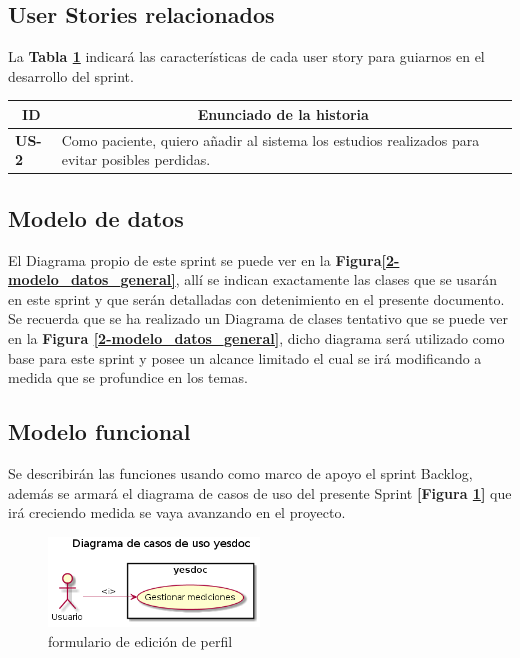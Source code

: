 \documentclass[a4paper,12pt]{article}
\begin{document}
\subsection{User Stories relacionados}
La \textbf{Tabla \ref{US-Sprint8}} indicará las características de cada user story para guiarnos en el desarrollo del sprint.
\begin{table}[h]
    \label{US-Sprint8}
    \centering
	\begin{tabular}{|l|p{9cm}|}
	\hline
        \multicolumn{1}{|c|}{\textbf{ID}} &
        \multicolumn{1}{|c|}{\textbf{Enunciado de la historia}} \\          
    \hline
        \textbf{US-2 } & Como paciente, quiero añadir al sistema los estudios realizados para evitar posibles perdidas.\\
     \hline 
     
    \end{tabular}
\end{table}

\subsection{Modelo de datos}
El Diagrama propio de este sprint se puede ver en la \textbf{Figura\ref{2-modelo_datos_general}}, allí se indican exactamente las clases que se usarán en este sprint y que serán detalladas con detenimiento en el presente documento. Se recuerda que se ha realizado un Diagrama de clases tentativo que se puede ver en la \textbf{Figura \ref{2-modelo_datos_general}}, dicho diagrama  será utilizado como base para este sprint y posee un alcance limitado el cual se irá modificando a medida que se profundice en los temas.




\subsection{Modelo funcional} %
Se describirán las funciones usando como marco de apoyo el sprint Backlog, además se armará el diagrama de casos de uso del presente Sprint \textbf{[Figura \ref{2-caso_de_uso}]} que irá creciendo  medida se vaya avanzando en el proyecto.


    \begin{figure}[h]
        \centering
        \includegraphics[width=0.5\textwidth]{img/2-caso_de_uso}
        \caption{formulario de edición de perfil}
		\label{2-caso_de_uso}
    \end{figure}
\end{document}
